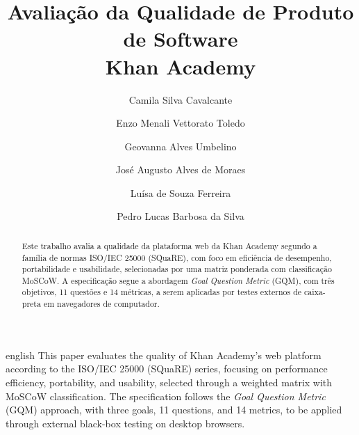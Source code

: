 \documentclass[sigconf, language=english, language=brazilian,natbib=false]{acmart}
\begin{document}
\title[Avaliação da Qualidade de Produto - Khan Academy]{Avaliação da Qualidade de Produto de Software \\ \large Khan Academy}

\author{Camila Silva Cavalcante}

\author{Enzo Menali Vettorato Toledo}

\author{Geovanna Alves Umbelino}

\author{José Augusto Alves de Moraes}

\author{Luísa de Souza Ferreira}

\author{Pedro Lucas Barbosa da Silva}

\renewcommand{\shortauthors}{Irmã Mary Keller}


\begin{abstract}
Este trabalho avalia a qualidade da plataforma web da Khan Academy segundo a família de normas ISO/IEC 25000 (SQuaRE), com foco em eficiência de desempenho, portabilidade e usabilidade, selecionadas por uma matriz ponderada com classificação MoSCoW. A especificação segue a abordagem \textit{Goal Question Metric} (GQM), com três objetivos, 11 questões e 14 métricas, a serem aplicadas por testes externos de caixa-preta em navegadores de computador.
\end{abstract}

\begin{translatedabstract}{english}
This paper evaluates the quality of Khan Academy's web platform according to the ISO/IEC 25000 (SQuaRE) series, focusing on performance efficiency, portability, and usability, selected through a weighted matrix with MoSCoW classification. The specification follows the \textit{Goal Question Metric} (GQM) approach, with three goals, 11 questions, and 14 metrics, to be applied through external black-box testing on desktop browsers.
\end{translatedabstract}
\end{document}
